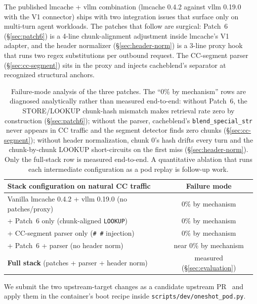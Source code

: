 The published lmcache + vllm combination (lmcache 0.4.2 against
vllm 0.19.0 with the V1 connector) ships with two integration issues
that surface only on multi-turn agent workloads. The patches that
follow are surgical: Patch~6 (\S\ref{sec:patch6}) is a 4-line
chunk-alignment adjustment inside lmcache's V1 adapter, and the
header normalizer (\S\ref{sec:header-norm}) is a 3-line proxy hook
that runs two regex substitutions per outbound request. The CC-segment
parser (\S\ref{sec:cc-segment}) sits in the proxy and injects
cacheblend's separator at recognized structural anchors.

\begin{table}[h]
\footnotesize
\centering
\begin{tabular}{lc}
\toprule
Stack configuration on natural CC traffic & Failure mode \\
\midrule
Vanilla lmcache 0.4.2 + vllm 0.19.0 (no patches/proxy) & 0\% by mechanism \\
+ Patch~6 only (chunk-aligned \texttt{LOOKUP})         & 0\% by mechanism \\
+ CC-segment parser only (\texttt{\#\,\#} injection)   & 0\% by mechanism \\
+ Patch~6 + parser (no header norm)                    & near 0\% by mechanism \\
\textbf{Full stack} (patches + parser + header norm)   & measured (\S\ref{sec:evaluation}) \\
\bottomrule
\end{tabular}
\caption{Failure-mode analysis of the three patches. The
``0\% by mechanism'' rows are diagnosed analytically rather than
measured end-to-end: without Patch~6, the STORE/LOOKUP chunk-hash
mismatch makes retrieval rate zero by construction
(\S\ref{sec:patch6}); without the parser, cacheblend's
\texttt{blend\_special\_str} never appears in CC traffic and the
segment detector finds zero chunks (\S\ref{sec:cc-segment});
without header normalization, chunk 0's hash drifts every turn and
the chunk-by-chunk LOOKUP short-circuits on the first miss
(\S\ref{sec:header-norm}). Only the full-stack row is measured
end-to-end. A quantitative ablation that runs each intermediate
configuration as a pod replay is follow-up work.}
\label{tab:patch-failure-modes}
\end{table}

\noindent We submit the two upstream-target changes as a candidate
upstream PR~\cite{lmcache-pr-tbd} and apply them in the
container's boot recipe inside
\texttt{scripts/dev/oneshot\_pod.py}.

